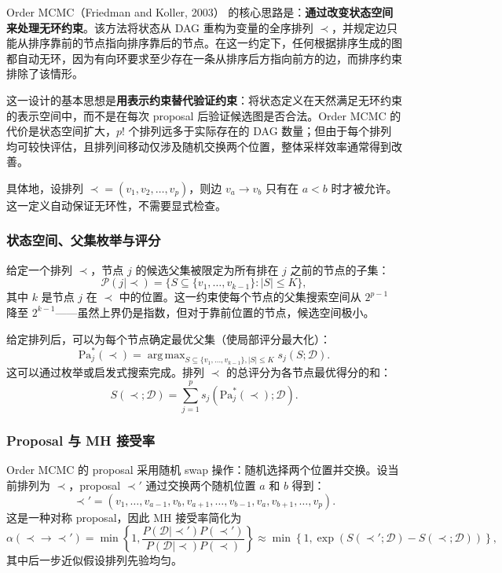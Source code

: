 \documentclass[UTF8,a4paper,12pt]{ctexart}
\DeclareMathOperator*{\argmax}{arg\,max}
\begin{document}
Order MCMC（Friedman and Koller, 2003）\citep{friedman2003being} 的核心思路是：\textbf{通过改变状态空间来处理无环约束}。该方法将状态从 DAG 重构为变量的全序排列 $\prec$，并规定边只能从排序靠前的节点指向排序靠后的节点。在这一约定下，任何根据排序生成的图都自动无环，因为有向环要求至少存在一条从排序后方指向前方的边，而排序约束排除了该情形。

这一设计的基本思想是\textbf{用表示约束替代验证约束}：将状态定义在天然满足无环约束的表示空间中，而不是在每次 proposal 后验证候选图是否合法。Order MCMC 的代价是状态空间扩大，$p!$ 个排列远多于实际存在的 DAG 数量；但由于每个排列均可较快评估，且排列间移动仅涉及随机交换两个位置，整体采样效率通常得到改善。

具体地，设排列 $\prec = (v_1, v_2, \ldots, v_p)$，则边 $v_a \to v_b$ 只有在 $a < b$ 时才被允许。这一定义自动保证无环性，不需要显式检查。

\subsubsection{状态空间、父集枚举与评分}

给定一个排列 $\prec$，节点 $j$ 的候选父集被限定为所有排在 $j$ 之前的节点的子集：
\begin{equation}
\mathcal{P}(j \mid \prec) = \{S \subseteq \{v_1, \ldots, v_{k-1}\} : |S| \leq K\},
\end{equation}
其中 $k$ 是节点 $j$ 在 $\prec$ 中的位置。这一约束使每个节点的父集搜索空间从 $2^{p-1}$ 降至 $2^{k-1}$——虽然上界仍是指数，但对于靠前位置的节点，候选空间极小。

给定排列后，可以为每个节点确定最优父集（使局部评分最大化）：
\begin{equation}
\mathrm{Pa}_j^*(\prec) = \argmax_{S \subseteq \{v_1, \ldots, v_{k-1}\}, |S| \leq K} s_j(S; \mathcal{D}).
\end{equation}
这可以通过枚举或启发式搜索完成。排列 $\prec$ 的总评分为各节点最优得分的和：
\begin{equation}
S(\prec; \mathcal{D}) = \sum_{j=1}^{p} s_j(\mathrm{Pa}_j^*(\prec); \mathcal{D}).
\end{equation}

\subsubsection{Proposal 与 MH 接受率}

Order MCMC 的 proposal 采用随机 swap 操作：随机选择两个位置并交换。设当前排列为 $\prec$，proposal $\prec'$ 通过交换两个随机位置 $a$ 和 $b$ 得到：
\begin{equation}
\prec' = (v_1, \ldots, v_{a-1}, v_b, v_{a+1}, \ldots, v_{b-1}, v_a, v_{b+1}, \ldots, v_p).
\end{equation}
这是一种对称 proposal，因此 MH 接受率简化为
\begin{equation}
\alpha(\prec \to \prec') = \min\left\{1, \frac{P(\mathcal{D} \mid \prec') P(\prec')}{P(\mathcal{D} \mid \prec) P(\prec)}\right\}
\approx \min\left\{1, \exp(S(\prec'; \mathcal{D}) - S(\prec; \mathcal{D}))\right\},
\end{equation}
其中后一步近似假设排列先验均匀。
\end{document}
